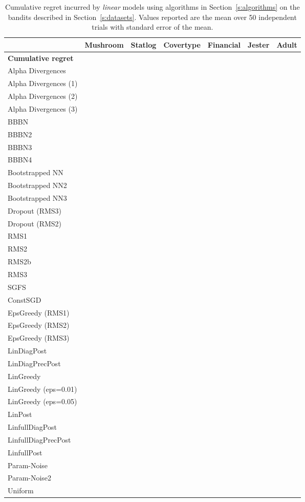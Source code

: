 \documentclass{article} \usepackage{iclr2018_conference,times}
\begin{document}
\begin{landscape}
\begin{table}[ht]
  \caption{Cumulative regret incurred by \emph{linear} models using algorithms in Section~\ref{s:algorithms} on the bandits described in Section~\ref{s:datasets}. Values reported are the mean over 50 independent trials with standard error of the mean.}
  \label{tab:linear_cum_regret_appendix}
  \centering
  \footnotesize
  \tiny
  \begin{tabular}{lllllll}
    & Mushroom & Statlog & Covertype & Financial & Jester & Adult \\
    \midrule
\textbf{Cumulative regret} & & & & & &  \\
    \midrule
Alpha Divergences & & & & & &  \\
Alpha Divergences (1) & & & & & &  \\
Alpha Divergences (2) & & & & & &  \\
Alpha Divergences (3) & & & & & &  \\
BBBN & & \bm{}& \bm{}& & \bm{}& \bm{} \\
BBBN2 & & & & & \bm{}&  \\
BBBN3 & & & & & &  \\
BBBN4 & & & & & \bm{}&  \\
Bootstrapped NN & & & & & &  \\
Bootstrapped NN2 & & & & & &  \\
Bootstrapped NN3 & & \bm{}& & \bm{}& &  \\
Dropout (RMS3) & & & & \bm{}& \bm{}&  \\
Dropout (RMS2) & & & & & &  \\
RMS1 & & & & & &  \\
RMS2 & & & & & \bm{}&  \\
RMS2b & & & & & \bm{}&  \\
RMS3 & & & & \bm{}& &  \\
SGFS & & & & & &  \\
ConstSGD & & & & & &  \\
EpsGreedy (RMS1) & & & & & &  \\
EpsGreedy (RMS2) & & & & & \bm{}&  \\
EpsGreedy (RMS3) & & & & & \bm{}&  \\
LinDiagPost & & & & & \bm{}&  \\
LinDiagPrecPost & & & & & \bm{}&  \\
LinGreedy & & & & \bm{}& \bm{}&  \\
LinGreedy (eps=0.01) & & & & & &  \\
LinGreedy (eps=0.05) & & & & & &  \\
LinPost & & & & & &  \\
LinfullDiagPost & & & & & &  \\
LinfullDiagPrecPost & & & \bm{}& & &  \\
LinfullPost & \bm{}& & \bm{}& & &  \\
Param-Noise & & & & & &  \\
Param-Noise2 & & & & \bm{}& &  \\
Uniform & & & & & &  \\
    \bottomrule
  \end{tabular}


\end{table}
\end{landscape}
\end{document}
